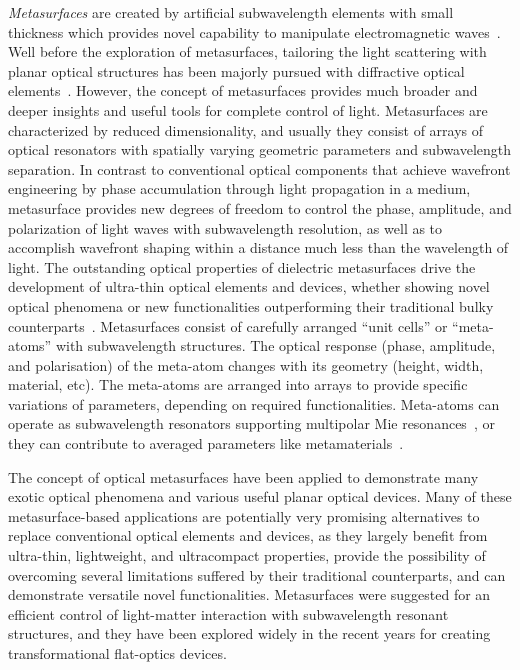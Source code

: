 \documentclass[journal=chreay,manuscript=review]{achemso}
\begin{document}
{\it Metasurfaces} are created by artificial subwavelength elements with small thickness which provides novel capability to manipulate electromagnetic waves~\cite{kildishev_2013}. Well before the exploration of metasurfaces, tailoring the light scattering with planar optical structures has been majorly pursued with diffractive optical elements~\cite{lalanne_2017}. However, the concept of metasurfaces provides much broader and deeper insights and useful tools for complete control of light. Metasurfaces are characterized by reduced dimensionality, and usually they consist of arrays of optical resonators with spatially varying geometric parameters and subwavelength separation. In contrast to conventional optical components that achieve wavefront engineering by phase accumulation through light propagation in a medium, metasurface provides new degrees of freedom to control the phase, amplitude, and polarization of light waves with subwavelength resolution, as well as to accomplish wavefront shaping within a distance much less than the wavelength of light\cite{jung2021metasurface}. The outstanding optical properties of dielectric metasurfaces drive the development of ultra-thin optical elements and devices, whether showing novel optical phenomena or new functionalities outperforming their traditional bulky counterparts~\cite{levy_2020}. Metasurfaces consist of carefully arranged “unit cells” or “meta-atoms” with subwavelength structures. The optical response (phase, amplitude, and polarisation) of the meta-atom changes with its geometry (height, width, material, etc). The meta-atoms are arranged into arrays to provide specific variations of parameters, depending on required functionalities. Meta-atoms can operate as subwavelength resonators supporting multipolar Mie resonances~\cite{kruk_2017}, or they can contribute to averaged parameters like metamaterials~\cite{tsai_2017}.

The concept of optical metasurfaces have been applied to demonstrate many exotic optical phenomena and various useful planar optical devices. Many of these metasurface-based applications are potentially very promising alternatives to replace conventional optical elements and devices, as they largely benefit from ultra-thin, lightweight, and ultracompact properties, provide the possibility of overcoming several limitations suffered by their traditional counterparts, and can demonstrate versatile novel functionalities. Metasurfaces were suggested for an efficient control of light-matter interaction with subwavelength resonant structures, and they have been explored widely in the recent years for creating transformational flat-optics devices.
\end{document}
